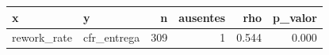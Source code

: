 \begin{tabular}{llrrrr}
\toprule
x & y & n & ausentes & rho & p\_valor \\
\midrule
rework\_rate & cfr\_entrega & 309 & 1 & 0.544 & 0.000 \\
\bottomrule
\end{tabular}
